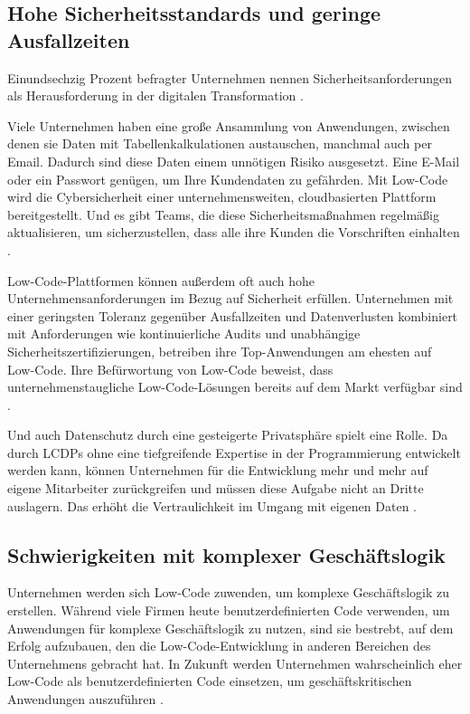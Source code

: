 \documentclass[12pt]{article} %
\begin{document}
	\subsection{Hohe Sicherheitsstandards und geringe Ausfallzeiten} 
	Einundsechzig Prozent befragter Unternehmen nennen Sicherheitsanforderungen als Herausforderung in der digitalen Transformation \cite{EmmaVanPelt.2019}. %
	
	Viele Unternehmen haben eine große Ansammlung von Anwendungen, zwischen denen sie Daten mit Tabellenkalkulationen austauschen, manchmal auch per Email. Dadurch sind diese Daten einem unnötigen Risiko ausgesetzt. Eine E-Mail oder ein Passwort genügen, um Ihre Kundendaten zu gefährden. Mit Low-Code wird die Cybersicherheit einer unternehmensweiten, cloudbasierten Plattform bereitgestellt. Und es gibt Teams, die diese Sicherheitsmaßnahmen regelmäßig aktualisieren, um sicherzustellen, dass alle ihre Kunden die Vorschriften einhalten \cite{KevinShuler.2023}. 
	
	Low-Code-Plattformen können außerdem oft auch hohe Unternehmensanforderungen im Bezug auf Sicherheit erfüllen. Unternehmen mit einer geringsten Toleranz gegenüber Ausfallzeiten und Datenverlusten kombiniert mit Anforderungen wie kontinuierliche Audits und unabhängige Sicherheitszertifizierungen, betreiben ihre Top-Anwendungen am ehesten auf Low-Code. Ihre Befürwortung von Low-Code beweist, dass unternehmenstaugliche Low-Code-Lösungen bereits auf dem Markt verfügbar sind \cite{EmmaVanPelt.2019}. \newline
	
	Und auch Datenschutz durch eine gesteigerte Privatsphäre spielt eine Rolle. Da durch LCDPs ohne eine tiefgreifende Expertise in der Programmierung entwickelt werden kann, können Unternehmen für die Entwicklung mehr und mehr auf eigene Mitarbeiter zurückgreifen und müssen diese Aufgabe nicht an Dritte auslagern. Das erhöht die Vertraulichkeit im Umgang mit eigenen Daten \cite{Sanchis.2020b}.
	
	\subsection{Schwierigkeiten mit komplexer Geschäftslogik}
	Unternehmen werden sich Low-Code zuwenden, um komplexe Geschäftslogik zu erstellen.
	Während viele Firmen heute benutzerdefinierten Code verwenden, um Anwendungen für komplexe
	Geschäftslogik zu nutzen, sind sie bestrebt, auf dem Erfolg aufzubauen, den die Low-Code-Entwicklung in anderen Bereichen des Unternehmens gebracht hat. In Zukunft werden Unternehmen wahrscheinlich eher Low-Code als benutzerdefinierten Code einsetzen, um geschäftskritischen Anwendungen auszuführen \cite{EmmaVanPelt.2019}.
	
\end{document}
